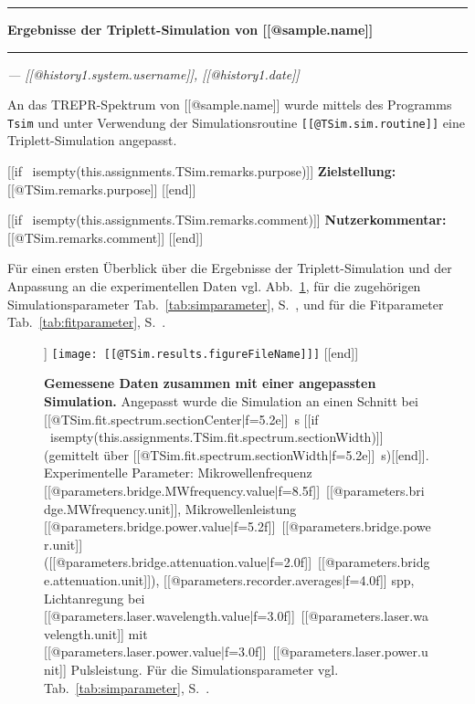 \documentclass{article}
\begin{document}
\thispagestyle{empty}

\vspace*{-1.5cm}

\noindent\rule[1.5ex]{\textwidth}{1pt}

\begin{sffamily}\bfseries\large
Ergebnisse der Triplett-Simulation von [[@sample.name]]
\end{sffamily}

\noindent\rule{\textwidth}{1pt}

\begin{flushright}\slshape
--- [[@history{1}.system.username]], [[@history{1}.date]]
\end{flushright}

\vspace*{1.5em}

An das TREPR-Spektrum von [[@sample.name]] wurde mittels des Programms \texttt{Tsim} und unter Verwendung der Simulationsroutine \texttt{[[@TSim.sim.routine]]} eine Triplett-Simulation angepasst.

[[if ~isempty(this.assignments.TSim.remarks.purpose)]]
\textbf{Zielstellung:} [[@TSim.remarks.purpose]]
[[end]]

[[if ~isempty(this.assignments.TSim.remarks.comment)]]
\textbf{Nutzerkommentar:} [[@TSim.remarks.comment]]
[[end]]

Für einen ersten Überblick über die Ergebnisse der Triplett-Simulation und der Anpassung an die experimentellen Daten vgl. Abb.~\ref{fig:ergebnisse}, für die zugehörigen Simulationsparameter Tab.~\ref{tab:simparameter}, S.~\pageref{tab:simparameter}, und für die Fitparameter Tab.~\ref{tab:fitparameter}, S.~\pageref{tab:fitparameter}.


\begin{figure}[h]
\centering
[[if ~isempty(this.assignments.TSim.results.figureFileName)]]
\texttt{[image: [[@TSim.results.figureFileName]]]}
[[end]]
\caption{\textbf{Gemessene Daten zusammen mit einer angepassten Simulation.} Angepasst wurde die Simulation an einen Schnitt bei [[@TSim.fit.spectrum.sectionCenter|f=5.2e]]~s 
%
[[if ~isempty(this.assignments.TSim.fit.spectrum.sectionWidth)]](gemittelt über [[@TSim.fit.spectrum.sectionWidth|f=5.2e]]~s)[[end]]. Experimentelle Parameter: Mikrowellenfrequenz [[@parameters.bridge.MWfrequency.value|f=8.5f]]~[[@parameters.bridge.MWfrequency.unit]], Mikrowellenleistung [[@parameters.bridge.power.value|f=5.2f]]~[[@parameters.bridge.power.unit]] ([[@parameters.bridge.attenuation.value|f=2.0f]]~[[@parameters.bridge.attenuation.unit]]), [[@parameters.recorder.averages|f=4.0f]] spp, Lichtanregung bei [[@parameters.laser.wavelength.value|f=3.0f]]~[[@parameters.laser.wavelength.unit]] mit [[@parameters.laser.power.value|f=3.0f]]~[[@parameters.laser.power.unit]] Pulsleistung. Für die Simulationsparameter vgl. Tab.~\ref{tab:simparameter}, S.~\pageref{tab:simparameter}.}
\label{fig:ergebnisse}
\end{figure}
\end{document}
